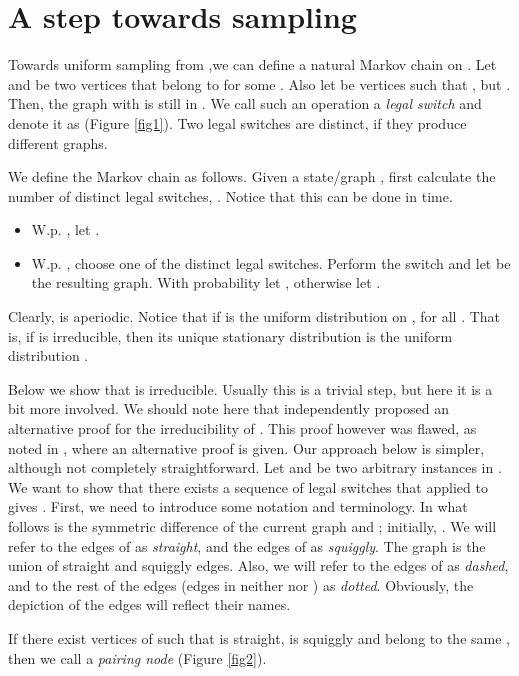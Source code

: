 \documentclass[12pt,a4paper]{article}
\theoremstyle{definition}
\theoremstyle{plain}
\begin{document}
\section{A step towards sampling}
\label{sec:Sampling}



Towards uniform sampling from ,we can define 
a natural Markov chain on .
Let  and  be two vertices that belong to  for some .
Also let  be vertices such that , but .
Then, the graph  with  is 
still in . We call such an operation a \emph{legal switch} and denote it
as  (Figure \ref{fig1}). Two legal switches are distinct, if they produce different
graphs.\medskip


We define the Markov chain  as follows.
Given a state/graph , first calculate the number of distinct legal 
switches, . Notice that this can be done in  time.
\begin{itemize}
	\item W.p. , let .
	\item W.p. , choose one of the  distinct legal switches. Perform
	the switch and let  be the resulting graph. With probability
	 let , otherwise let .
\end{itemize}

Clearly,  is aperiodic. Notice that if  is the uniform distribution on ,
for all . That is, if  is
irreducible, then its unique stationary distribution is the uniform distribution .

Below we show that   is irreducible. Usually this is a trivial step,
but here it is a bit more involved. We should note here that 
\cite{SP12} independently proposed an alternative proof for the irreducibility of . This proof however was flawed, as noted in \cite{CDEM15}, where an alternative proof is given. Our approach below is simpler, although not completely straightforward.  Let  and
 be two arbitrary instances in . We want to show that there exists
a sequence of legal switches that applied to  gives . First, we need 
to introduce some notation and terminology. In what follows  is the symmetric
difference of the current graph  and ; initially, . We will refer 
to the edges of  as \emph{straight}, and the edges of 
 as \emph{squiggly}. The graph  is the union of straight 
and squiggly edges. Also, we will refer to the edges of  as
\emph{dashed}, and to the rest of the edges (edges in neither  nor ) 
as \emph{dotted}. Obviously, the depiction of the edges will reflect their names.

If there exist vertices  of  such that  is straight,  is squiggly
and  belong to the same , then we call  a \emph{pairing node} (Figure \ref{fig2}).
\end{document}
